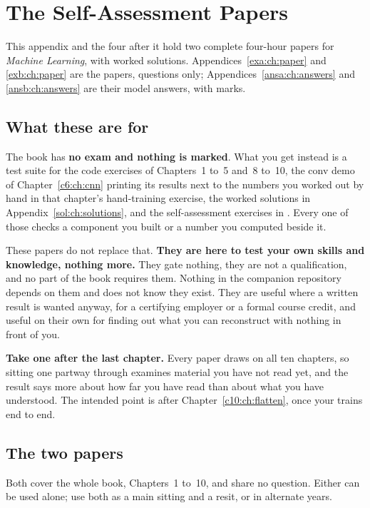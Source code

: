 
\chapter{The Self-Assessment Papers}
\label{exam:ch:about}

This appendix and the four after it hold two complete four-hour papers for \emph{Machine Learning},
with worked solutions. Appendices~\ref{exa:ch:paper} and \ref{exb:ch:paper} are the papers,
questions only; Appendices~\ref{ansa:ch:answers} and \ref{ansb:ch:answers} are their model answers,
with marks.

\section*{What these are for}
The book has \textbf{no exam and nothing is marked}. What you get instead is a test suite for the
code exercises of Chapters~1 to~5 and~8 to~10, the conv demo of Chapter~\ref{c6:ch:cnn} printing its
results next to the numbers you worked out by hand in that chapter's hand-training exercise, the
worked solutions in Appendix~\ref{sol:ch:solutions}, and the self-assessment exercises in
. Every one of those checks a component you built or a number you computed
beside it.

These papers do not replace that. \textbf{They are here to test your own skills and knowledge,
nothing more.} They gate nothing, they are not a qualification, and no part of the book requires
them. Nothing in the companion repository depends on them and  does not know they
exist. They are useful where a written result is wanted anyway, for a certifying employer or a
formal course credit, and useful on their own for finding out what you can reconstruct with nothing
in front of you.

\textbf{Take one after the last chapter.} Every paper draws on all ten chapters, so sitting one
partway through examines material you have not read yet, and the result says more about how far you
have read than about what you have understood. The intended point is after
Chapter~\ref{c10:ch:flatten}, once your  trains end to end.

\section*{The two papers}
Both cover the whole book, Chapters~1 to~10, and share no question. Either can be used alone; use
both as a main sitting and a resit, or in alternate years.

